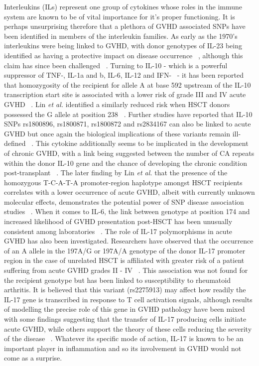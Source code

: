 Interleukins (ILs) represent one group of cytokines whose roles in the immune system are known to be of vital importance for it's proper functioning. It is perhaps unsurprising therefore that a plethora of GVHD associated SNPs have been identified in members of the interleukin families. As early as the 1970's interleukins were being linked to GVHD, with donor genotypes of IL-23 being identified as having a protective impact on disease occurrence ~\autocite{Glu1974}, although this claim has since been challenged ~\autocite{Ngu2010}. Turning to IL-10 - which is a powerful suppressor of TNF-\textalpha, IL-1a and b,  IL-6, IL-12 and IFN-\textgamma ~\autocite{Lin2003, Tak2000} - it has been reported that homozygosity of the recipient for allele A at base 592 upstream of the IL-10 transcription start site is associated with a lower risk of grade III and IV acute GVHD ~\autocite{Tin2013}. Lin \textit{et al. } identified a similarly reduced risk when HSCT donors possessed the G allele at position 238 ~\autocite{Lin2003}. Further studies have reported that IL-10 SNPs rs1800896, rs1800871, rs1800872 and rs2834167 can also be linked to acute GVHD but once again the biological implications of these variants remain ill-defined ~\autocite{Chi2012,Han2010}. This cytokine additionally seems to be implicated in the development of chronic GVHD, with a link being suggested between the number of CA repeats within the donor IL-10 gene and the chance of developing the chronic condition post-transplant ~\autocite{Tak2000}. The later finding by Lin \textit{et al.} that the presence of the homozygous T-C-A-T-A promoter-region haplotype amongst HSCT recipients correlates with a lower occurrence of acute GVHD, albeit with currently unknown molecular effects, demonstrates the potential power of SNP disease association studies ~\autocite{Lin2003}. When it comes to IL-6, the link between genotype at position 174 and increased likelihood of GVHD presentation post-HSCT has been unusually consistent among laboratories ~\autocite{Dic2012}. The role of IL-17 polymorphisms in acute GVHD has also been investigated. Researchers have observed that the occurrence of an A allele in the 197A/G or 197A/A genotype of the donor IL-17 promoter region in the case of unrelated HSCT is affiliated with greater risk of a patient suffering from acute GVHD grades II - IV ~\autocite{Esp2011}. This association was not found for the recipient genotype but has been linked to susceptibility to rheumatoid arthritis. It is believed that this variant (rs2275913) may affect how readily the IL-17 gene is transcribed in response to T cell activation signals, although results of modelling the precise role of this gene in GVHD pathology have been mixed with some findings suggesting that the transfer of IL-17 producing cells initiate acute GVHD, while others support the theory of these cells reducing the severity of the disease ~\autocite{Esp2011}. Whatever its specific mode of action, IL-17 is known to be an important player in inflammation and so its involvement in GVHD would not come as a surprise. 

